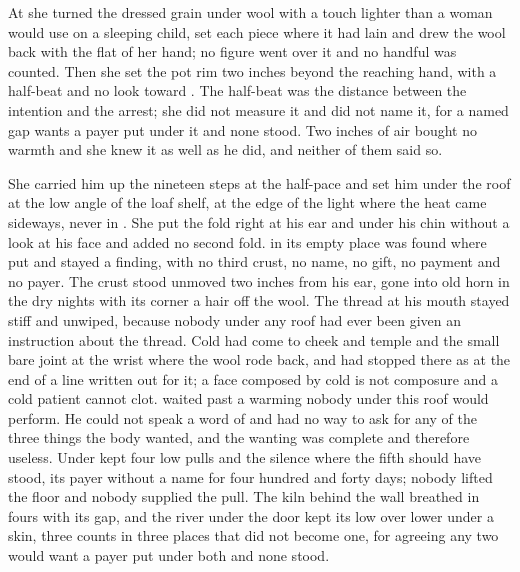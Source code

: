 At  she turned the dressed grain under wool with a touch lighter than a woman would use on a sleeping child, set each piece where it had lain and drew the wool back with the flat of her hand; no figure went over it and no handful was counted. Then she set the pot rim two inches beyond the reaching hand, with a half-beat and no look toward . The half-beat was the distance between the intention and the arrest; she did not measure it and did not name it, for a named gap wants a payer put under it and none stood. Two inches of air bought no warmth and she knew it as well as he did, and neither of them said so.

She carried him up the nineteen steps at the half-pace and set him under the roof at the low angle of the loaf shelf, at the edge of the light where the heat came sideways, never in . She put the fold right at his ear and under his chin without a look at his face and added no second fold.  in its empty place was found where put and stayed a finding, with no third crust, no name, no gift, no payment and no payer. The crust stood unmoved two inches from his ear, gone into old horn in the dry nights with its corner a hair off the wool. The thread at his mouth stayed stiff and unwiped, because nobody under any roof had ever been given an instruction about the thread. Cold had come to cheek and temple and the small bare joint at the wrist where the wool rode back, and had stopped there as at the end of a line written out for it; a face composed by cold is not composure and a cold patient cannot clot.  waited past a warming nobody under this roof would perform. He could not speak a word of  and had no way to ask for any of the three things the body wanted, and the wanting was complete and therefore useless. Under   kept four low pulls and the silence where the fifth should have stood, its payer without a name for four hundred and forty days; nobody lifted the floor and nobody supplied the pull. The kiln behind the wall breathed in fours with its gap, and the river under the door kept its low over lower under a skin, three counts in three places that did not become one, for agreeing any two would want a payer put under both and none stood.

\scenebreak

